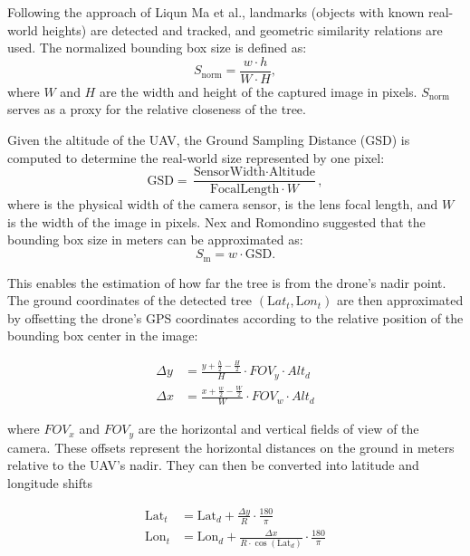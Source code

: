 Following the approach of Liqun Ma et al., landmarks (objects with known real-world heights) are detected and tracked, and geometric similarity relations are used. The normalized bounding box size is defined as:
\begin{equation}
	S_\text{norm} = \frac{w \cdot h}{W \cdot H},
\end{equation}
where $W$ and $H$ are the width and height of the captured image in pixels. $S_\text{norm}$ serves as a proxy for the relative closeness of the tree.

Given the altitude of the UAV, the Ground Sampling Distance (GSD) is computed to determine the real-world size represented by one pixel:
\begin{equation}
	\text{GSD} = \frac{\text{SensorWidth} \cdot \text{Altitude}}{\text{FocalLength} \cdot W},
\end{equation}
where  is the physical width of the camera sensor,  is the lens focal length, and $W$ is the width of the image in pixels. Nex and Romondino suggested that the bounding box size in meters can be approximated as:
\begin{equation}
	S_\text{m} = w \cdot \text{GSD}.
\end{equation}

This enables the estimation of how far the tree is from the drone’s nadir point. The ground coordinates of the detected tree $(\text{L}at_t, \text{L}on_t)$ are then approximated by offsetting the drone’s GPS coordinates according to the relative position of the bounding box center in the image:

\begin{align}
	\Delta y & = \frac{y + \frac{h}{2} - \frac{H}{2}}{H} \cdot FOV_y \cdot Alt_d \\
	\Delta x & = \frac{x + \frac{w}{2} - \frac{W}{2}}{W} \cdot FOV_w \cdot Alt_d
\end{align}

where $FOV_x$ and $FOV_y$ are the horizontal and vertical fields of view of the camera. These offsets represent the horizontal distances on the ground in meters relative to the UAV’s nadir. They can then be converted into latitude and longitude shifts


\begin{align}
	\text{Lat}_t & = \text{Lat}_d + \frac{\Delta y}{R} \cdot \frac{180}{\pi}                          \\
	\text{Lon}_t & = \text{Lon}_d + \frac{\Delta x}{R \cdot \cos(\text{Lat}_d)} \cdot \frac{180}{\pi}
\end{align}

